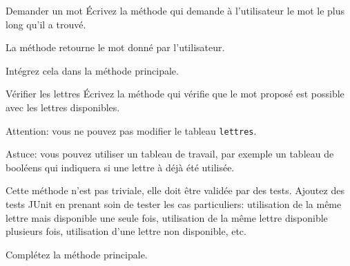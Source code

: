 \documentclass[a4paper,11pt]{style-esi/td}
\begin{document}
	
 	\begin{Exercice}{Demander un mot}
		\'Ecrivez la méthode 
		qui demande à l'utilisateur le mot le plus long qu'il a trouvé.
		 
		La méthode retourne le mot donné par l'utilisateur. 
		
		Intégrez cela dans la méthode principale.
	\end{Exercice} 
	
 	\begin{Exercice}{Vérifier les lettres}
 			\'Ecrivez la méthode 
		qui vérifie que le mot proposé est possible avec les lettres 
		disponibles. 
		
		Attention: vous ne pouvez pas modifier le tableau \texttt{lettres}.
		
		Astuce: vous pouvez utiliser un tableau de travail, par exemple un 
		tableau de booléens qui indiquera si une lettre à déjà été utilisée.
		
		Cette méthode n'est pas triviale, elle doit être validée par des tests.
		Ajoutez des tests JUnit en prenant soin de tester les cas particuliers: 
		utilisation de la même lettre mais disponible une seule fois, utilisation de la 
		même lettre disponible plusieurs fois, utilisation d'une lettre non 
		disponible, etc.
		
		Complétez la méthode principale.
	\end{Exercice} 
	
\end{document}
